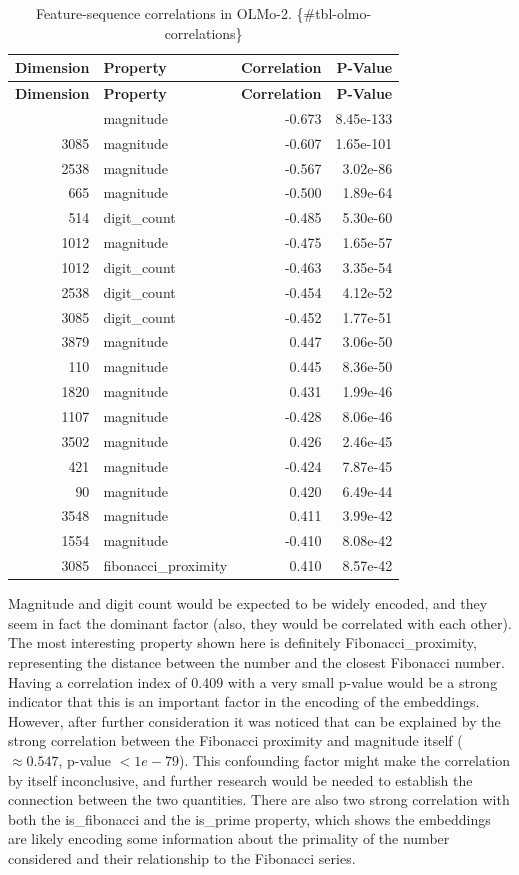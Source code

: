\documentclass[
  a4paper, twoside, 10pt, titlepage]{book}
\begin{document}
\begin{longtable}[]{@{}rlrr@{}}
\caption{Feature-sequence correlations in OLMo-2.
\{\#tbl-olmo-correlations\}}\tabularnewline
\toprule\noalign{}
\textbf{Dimension} & \textbf{Property} & \textbf{Correlation} &
\textbf{P-Value} \\
\midrule\noalign{}
\endfirsthead
\toprule\noalign{}
\textbf{Dimension} & \textbf{Property} & \textbf{Correlation} &
\textbf{P-Value} \\
\midrule\noalign{}
\endhead
\bottomrule\noalign{}
\endlastfoot
514 & magnitude & -0.673 & 8.45e-133 \\
3085 & magnitude & -0.607 & 1.65e-101 \\
2538 & magnitude & -0.567 & 3.02e-86 \\
665 & magnitude & -0.500 & 1.89e-64 \\
514 & digit\_count & -0.485 & 5.30e-60 \\
1012 & magnitude & -0.475 & 1.65e-57 \\
1012 & digit\_count & -0.463 & 3.35e-54 \\
2538 & digit\_count & -0.454 & 4.12e-52 \\
3085 & digit\_count & -0.452 & 1.77e-51 \\
3879 & magnitude & 0.447 & 3.06e-50 \\
110 & magnitude & 0.445 & 8.36e-50 \\
1820 & magnitude & 0.431 & 1.99e-46 \\
1107 & magnitude & -0.428 & 8.06e-46 \\
3502 & magnitude & 0.426 & 2.46e-45 \\
421 & magnitude & -0.424 & 7.87e-45 \\
90 & magnitude & 0.420 & 6.49e-44 \\
3548 & magnitude & 0.411 & 3.99e-42 \\
1554 & magnitude & -0.410 & 8.08e-42 \\
3085 & fibonacci\_proximity & 0.410 & 8.57e-42 \\
\end{longtable}

Magnitude and digit count would be expected to be widely encoded, and
they seem in fact the dominant factor (also, they would be correlated
with each other). The most interesting property shown here is definitely
Fibonacci\_proximity, representing the distance between the number and
the closest Fibonacci number. Having a correlation index of 0.409 with a
very small p-value would be a strong indicator that this is an important
factor in the encoding of the embeddings. However, after further
consideration it was noticed that can be explained by the strong
correlation between the Fibonacci proximity and magnitude itself
(\(\approx 0.547\), p-value \(< 1e-79\)). This confounding factor might
make the correlation by itself inconclusive, and further research would
be needed to establish the connection between the two quantities. There
are also two strong correlation with both the is\_fibonacci and the
is\_prime property, which shows the embeddings are likely encoding some
information about the primality of the number considered and their
relationship to the Fibonacci series.
\end{document}
